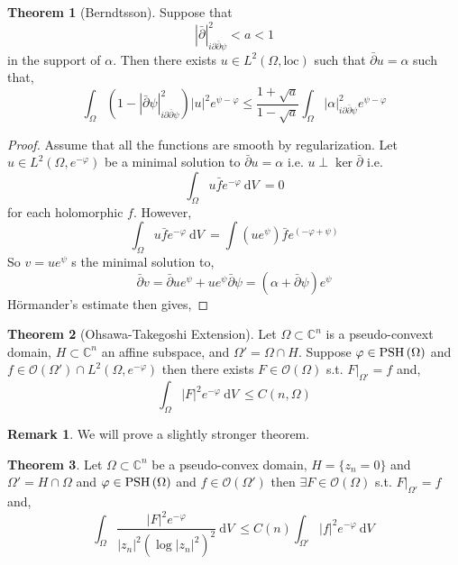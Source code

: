 \documentclass[12pt]{extarticle}
\newcommand{\C}{\mathbb{C}}
\renewcommand{\d}[1]{\: \mathrm{d}#1 \:}
\theoremstyle{definition}
\newtheorem{theorem}{Theorem}[section]
\newtheorem{remark}{Remark}
\begin{document}
\begin{theorem}[Berndtsson]
Suppose that 
\[ |\bar{\partial} |^2_{i \partial \bar{\partial} \psi} < a < 1 \]
in the support of $\alpha$. Then there exists $u \in L^2(\Omega, \text{loc})$ such that $\bar{\partial} u = \alpha$ such that,
\[ \int_\Omega \left( 1 - | \bar{\partial} \psi |^2_{i \partial \bar{\partial} \psi} \right) |u|^2 e^{\psi - \varphi} \le \frac{1 + \sqrt{a}}{1 - \sqrt{a}} \int_\Omega |\alpha|^2_{i \partial \bar{\partial} \psi} e^{\psi - \varphi} \]
\end{theorem}

\begin{proof}
Assume that all the functions are smooth by regularization. Let $u \in L^2(\Omega, e^{-\varphi})$ be a minimal solution to $\bar{\partial} u = \alpha$ i.e. $u \perp \ker{\bar{\partial}}$ i.e.
\[ \int_\Omega u \bar{f} e^{-\varphi} \d{V} = 0 \]
for each holomorphic $f$. However, 
\[ \int_\Omega u \bar{f} e^{-\varphi} \d{V} = \int (u e^\psi) \bar{f} e^{(-\varphi + \psi)} \]
So $v = u e^\psi$ s the minimal solution to,
\[ \bar{\partial} v = \bar{\partial} u e^\psi + u e^{\psi} \bar{\partial} \psi = (\alpha + \bar{\partial} \psi) e^\psi \]
H\"{o}rmander's estimate then gives,

\end{proof}

\begin{theorem}[Ohsawa-Takegoshi Extension]
Let $\Omega \subset \C^n$ is a pseudo-convext domain, $H  \subset \C^n$ an affine subspace, and $\Omega' = \Omega \cap H$. Suppose $\varphi \in \mathrm{PSH}\left( \Omega \right)$ and $f \in \mathcal{O}(\Omega') \cap L^2(\Omega, e^{-\varphi})$ then there exists $F \in \mathcal{O}(\Omega)$ s.t. $F |_{\Omega'} = f$ and,
\[ \int_\Omega |F|^2 e^{-\varphi} \d{V} \le C(n, \Omega) \]
\end{theorem}

\begin{remark}
We will prove a slightly stronger theorem.
\end{remark}

\begin{theorem}
Let $\Omega \subset \C^n$ be a pseudo-convex domain, $H = \{z_n = 0 \}$ and $\Omega' = H \cap \Omega$ and $\varphi \in \mathrm{PSH}\left( \Omega \right)$ and $f \in \mathcal{O}(\Omega')$ then $\exists F \in \mathcal{O}(\Omega)$ s.t. $F |_{\Omega'} = f$ and,
\[ \int_\Omega \frac{|F|^2 e^{-\varphi}}{|z_n|^2 (\log{|z_n|^2})^2} \d{V} \le C(n) \int_{\Omega'} |f|^2 e^{-\varphi} \d{V} \]
\end{theorem}
\end{document}
